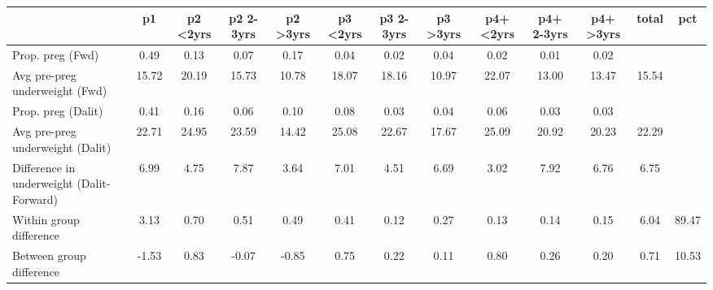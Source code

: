 \begin{tabular}{l*{12}{c}}
\toprule
            &\multicolumn{1}{c}{p1}&\multicolumn{1}{c}{p2 \textless2yrs}&\multicolumn{1}{c}{p2 2-3yrs}&\multicolumn{1}{c}{p2 \textgreater3yrs}&\multicolumn{1}{c}{p3 \textless2yrs}&\multicolumn{1}{c}{p3 2-3yrs}&\multicolumn{1}{c}{p3 \textgreater3yrs}&\multicolumn{1}{c}{p4+ \textless2yrs}&\multicolumn{1}{c}{p4+ 2-3yrs}&\multicolumn{1}{c}{p4+ \textgreater3yrs}&\multicolumn{1}{c}{total}&\multicolumn{1}{c}{pct}\\
\midrule
\midrule
Prop. preg (Fwd)&        0.49&        0.13&        0.07&        0.17&        0.04&        0.02&        0.04&        0.02&        0.01&        0.02&            &            \\
Avg pre-preg underweight (Fwd)&       15.72&       20.19&       15.73&       10.78&       18.07&       18.16&       10.97&       22.07&       13.00&       13.47&       15.54&            \\
Prop. preg (Dalit)&        0.41&        0.16&        0.06&        0.10&        0.08&        0.03&        0.04&        0.06&        0.03&        0.03&            &            \\
Avg pre-preg underweight (Dalit)&       22.71&       24.95&       23.59&       14.42&       25.08&       22.67&       17.67&       25.09&       20.92&       20.23&       22.29&            \\
Difference in underweight (Dalit-Forward)&        6.99&        4.75&        7.87&        3.64&        7.01&        4.51&        6.69&        3.02&        7.92&        6.76&        6.75&            \\
Within group difference&        3.13&        0.70&        0.51&        0.49&        0.41&        0.12&        0.27&        0.13&        0.14&        0.15&        6.04&       89.47\\
Between group difference&       -1.53&        0.83&       -0.07&       -0.85&        0.75&        0.22&        0.11&        0.80&        0.26&        0.20&        0.71&       10.53\\
\bottomrule
\end{tabular}
